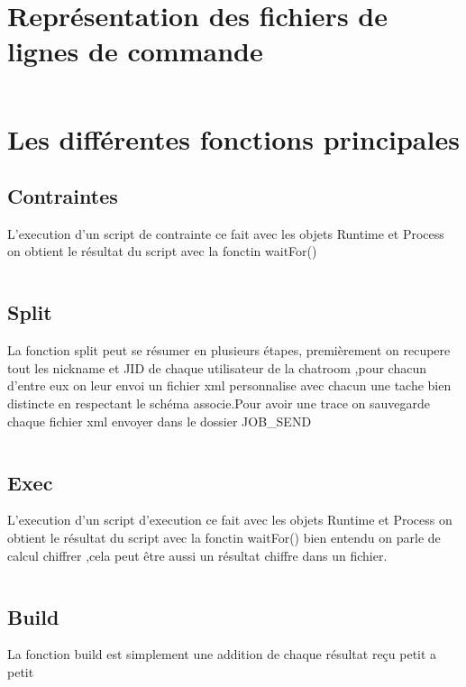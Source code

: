 \documentclass[11pt]{report}
\begin{document}
\inputminted{XML}{../Schema_XML/BDD_JOB.xsd}
\newpage 

\section{Représentation des fichiers de lignes de commande} 
\inputminted{bash}{../Echantillon_Script_Cmd/cmd.dc}
\newpage
\section{Les différentes fonctions principales}

\subsection{Contraintes} 
L'execution d'un script de contrainte ce fait avec les objets Runtime et Process on obtient le résultat du script avec la fonctin waitFor() 
\inputminted{perl}{../Echantillon_Script_Perl/DitributionContraintes.pl}
\subsection{Split} 
La fonction split peut se résumer en plusieurs étapes, premièrement on recupere tout les nickname et JID de chaque utilisateur de la chatroom ,pour chacun d'entre eux on leur envoi un fichier xml personnalise avec chacun une tache bien distincte en respectant le schéma associe.Pour avoir une trace on sauvegarde chaque fichier xml envoyer dans le dossier JOB\_SEND
\inputminted[tabsize=2,frame=lines,linenos]{java}{Fichier_import/split.java}
\subsection{Exec} 
L'execution d'un script d'execution ce fait avec les objets Runtime et Process on obtient le résultat du script avec la fonctin waitFor() bien entendu on parle de calcul chiffrer ,cela peut être aussi un résultat chiffre dans un fichier. 
\inputminted[tabsize=2,frame=lines,linenos]{Perl}{Fichier_import/calcul.pl}
\subsection{Build} 
La fonction build est simplement une addition de chaque résultat reçu petit a petit 
\inputminted[tabsize=2,frame=lines,linenos]{Perl}{Fichier_import/build.java}
\newpage
\end{document}
